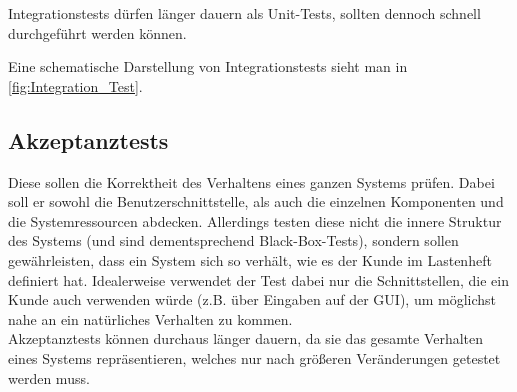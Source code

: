 Integrationstests dürfen länger dauern als Unit-Tests, sollten dennoch schnell durchgeführt werden können.

Eine schematische Darstellung von Integrationstests sieht man in \autoref{fig:Integration_Test}.

\subsection{Akzeptanztests} 

Diese sollen die Korrektheit des Verhaltens eines ganzen Systems prüfen. Dabei soll er sowohl die Benutzerschnittstelle, als auch die einzelnen Komponenten und die Systemressourcen abdecken. Allerdings testen diese nicht die innere Struktur des Systems (und sind dementsprechend Black-Box-Tests), sondern sollen gewährleisten, dass ein System sich so verhält, wie es der Kunde im Lastenheft definiert hat. Idealerweise verwendet der Test dabei nur die Schnittstellen, die ein Kunde auch verwenden würde (z.B. über Eingaben auf der GUI), um möglichst nahe an ein natürliches Verhalten zu kommen.\\
Akzeptanztests können durchaus länger dauern, da sie das gesamte Verhalten eines Systems repräsentieren, welches nur nach größeren Veränderungen getestet werden muss.

